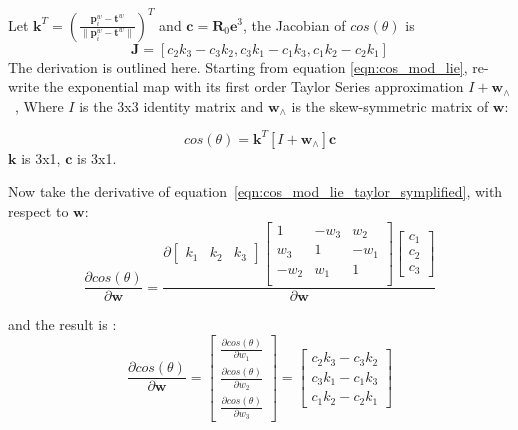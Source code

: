 \documentclass[letterpaper, 10 pt, conference]{ieeeconf}  %
\begin{document}
Let $\boldsymbol{k}^T=(\frac{\boldsymbol{p}_i^w - \boldsymbol{t}^w}{\|\boldsymbol{p}_i^w - \boldsymbol{t}^w\|})^T$ and $\boldsymbol{c}=\boldsymbol{R}_0\boldsymbol{e}^3$, the Jacobian of $cos(\theta)$ is
\begin{equation}
\boldsymbol{J}=[c_2k_3-c_3k_2 , c_3k_1-c_1k_3 , c_1k_2-c_2k_1]
\label{eqn:jacobian}
\end{equation}
The derivation is outlined here. Starting from equation \ref{eqn:cos_mod_lie}, re-write the exponential map with its first order Taylor Series approximation $I+\boldsymbol{w}_{\wedge}$~\cite{forster2015imu}, Where $I$ is the 3x3 identity matrix and $\boldsymbol{w}_{\wedge}$ is the skew-symmetric matrix of $\boldsymbol{w}$:

\begin{equation}
cos(\theta)=\boldsymbol{k}^T[I+\boldsymbol{w}_{\wedge}]\boldsymbol{c}
\label{eqn:cos_mod_lie_taylor_symplified}
\end{equation}
$\boldsymbol{k}$ is 3x1, $\boldsymbol{c}$ is 3x1.

Now take the derivative of equation~\ref{eqn:cos_mod_lie_taylor_symplified}, with respect to $\boldsymbol{w}$:
\begin{equation}
\frac{\partial cos(\theta)}{\partial\boldsymbol{w}}=
\frac{\partial \begin{bmatrix}
k_1&k_2&k_3
\end{bmatrix}
\begin{bmatrix}
1 & -w_3 & w_2\\
w_3 & 1 & -w_1\\
-w_2 & w_1 & 1\\
\end{bmatrix}
\begin{bmatrix}
c_1\\c_2\\c_3
\end{bmatrix}}
{\partial \boldsymbol{w}}
\label{eqn:derivative_expanded}
\end{equation}

and  the result is :
\begin{equation}
\frac{\partial cos(\theta)}{\partial\boldsymbol{w}}=
\begin{bmatrix}
 \frac{\partial cos(\theta)}{\partial w_{1}}\\
  \frac{\partial cos(\theta)}{\partial w_{2}}\\
   \frac{\partial cos(\theta)}{\partial w_{3}}
\end{bmatrix}
=
\begin{bmatrix}
    c_2k_3-c_3k_2\\
    c_3k_1-c_1k_3\\
    c_1k_2-c_2k_1
\end{bmatrix}
\label{eqn:result}
\end{equation}
\end{document}
